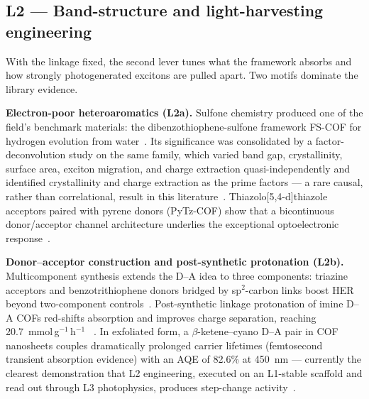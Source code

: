 \subsection{L2 --- Band-structure and light-harvesting engineering}
\label{sec:band}

With the linkage fixed, the second lever tunes what the framework absorbs and how strongly
photogenerated excitons are pulled apart. Two motifs dominate the library evidence.

\textbf{Electron-poor heteroaromatics (L2a).} Sulfone chemistry produced one of the field's
benchmark materials: the dibenzothiophene-sulfone framework FS-COF for hydrogen evolution from
water~\cite{wang2018sulfone}. Its significance was consolidated by a factor-deconvolution study
on the same family, which varied band gap, crystallinity, surface area, exciton migration, and
charge extraction quasi-independently and identified crystallinity and charge extraction as the
prime factors --- a rare causal, rather than correlational, result in this
literature~\cite{ghosh2020identification}. Thiazolo[5,4-d]thiazole acceptors paired with pyrene
donors (PyTz-COF) show that a bicontinuous donor/acceptor channel architecture underlies the
exceptional optoelectronic response~\cite{li2020thiazolo}.

\textbf{Donor--acceptor construction and post-synthetic protonation (L2b).} Multicomponent
synthesis extends the D--A idea to three components: triazine acceptors and benzotrithiophene
donors bridged by sp$^2$-carbon links boost HER beyond two-component
controls~\cite{li2023three}. Post-synthetic linkage protonation of imine D--A COFs red-shifts
absorption and improves charge separation, reaching 20.7~mmol\,g$^{-1}$\,h$^{-1}$
~\cite{yang2021protonated}. In exfoliated form, a $\beta$-ketene--cyano D--A pair in COF
nanosheets couples dramatically prolonged carrier lifetimes (femtosecond transient absorption
evidence) with an AQE of 82.6\% at 450~nm --- currently the clearest demonstration that L2
engineering, executed on an L1-stable scaffold and read out through L3 photophysics, produces
step-change activity~\cite{li2022covalent}.
